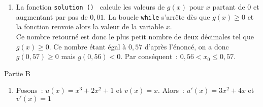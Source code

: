 \begin{corrige}
\begin{enumerate}
\begin{center}
\begin{extern}
{
                    }
               \end{extern}
          \end{center}
          \item
          La fonction  \og \texttt{solution () } \fg{}  calcule les valeurs de $ g (x)  $ pour $ x $ partant de  $ 0$ et augmentant par pas de $0,01.$
          \newpar
          La boucle \og  \texttt{while}  \fg{} s'arrête dès que $ g (x)   \geqslant 0$ et la fonction renvoie alors la valeur de la variable $ x. $  \\
          Ce nombre retourné est donc le plus petit nombre de deux décimales tel que  $ g (x)  \geqslant 0. $
          \newpar
          Ce nombre étant égal à $ 0,57 $ d'après l'énoncé, on a donc  $ g (0,57)  \geqslant 0 $ mais  $ g (0,56)  < 0. $
          \newpar
          Par conséquent~:  $ 0,56 < x_{ 0 }  \leqslant 0,57. $
     \end{enumerate}
     \begin{center}
          \begin{h3} Partie B \end{h3}
     \end{center}
     \begin{enumerate}
          \item
          Posons~:  $ u (x) =x^3 +2x^{ 2 } +1$ et $ v (x) =x $.
          \newpar
          Alors~:  $ u'  (x) =3x^2 +4x$ et $ v'  (x) =1 $

\end{enumerate}
\end{corrige}
